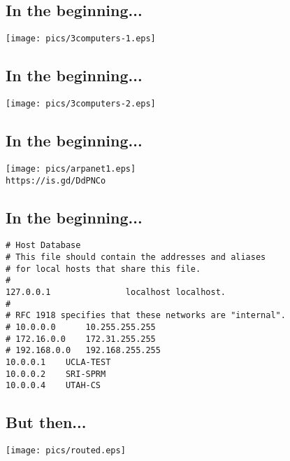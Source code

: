 \documentclass[xga]{xdvislides}
\begin{document}
\subsection{In the beginning...}
\vspace*{\fill}
\begin{center}
	\texttt{[image: pics/3computers-1.eps]} \\
\end{center}
\vspace*{\fill}

\subsection{In the beginning...}
\vspace*{\fill}
\begin{center}
	\texttt{[image: pics/3computers-2.eps]} \\
\end{center}
\vspace*{\fill}

\subsection{In the beginning...}
\vspace*{\fill}
\begin{center}
	\texttt{[image: pics/arpanet1.eps]} \\
	{\tt https://is.gd/DdPNCo} \\
\end{center}
\vspace*{\fill}


\subsection{In the beginning...}
\begin{verbatim}
# Host Database
# This file should contain the addresses and aliases
# for local hosts that share this file.
#
127.0.0.1               localhost localhost.
#
# RFC 1918 specifies that these networks are "internal".
# 10.0.0.0      10.255.255.255
# 172.16.0.0    172.31.255.255
# 192.168.0.0   192.168.255.255
10.0.0.1	UCLA-TEST
10.0.0.2	SRI-SPRM
10.0.0.4	UTAH-CS
\end{verbatim}


\subsection{But then...}
\vspace*{\fill}
\begin{center}
	\texttt{[image: pics/routed.eps]} \\
\end{center}
\vspace*{\fill}
\end{document}
